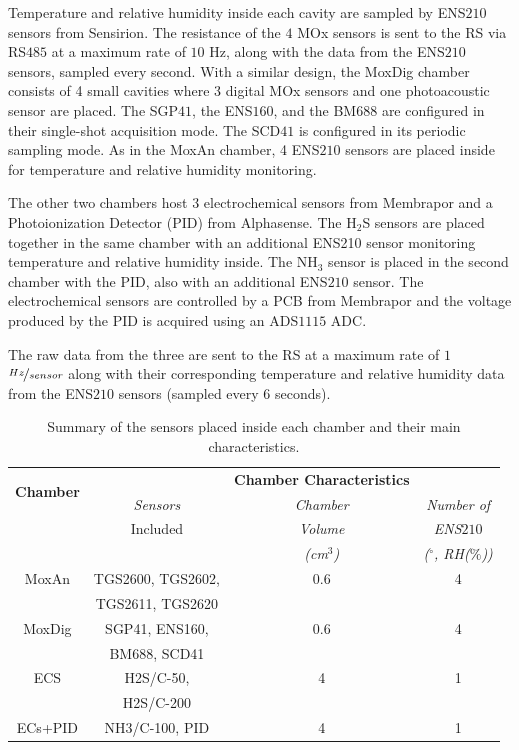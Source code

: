 \documentclass[lettersize,journal]{IEEEtran}
\begin{document}
Temperature and relative humidity inside each cavity are sampled by ENS$210$ sensors from Sensirion. The resistance of the $4$ MOx sensors is sent to the RS via RS$485$ at a maximum rate of $10$ Hz, along with the data from the ENS$210$ sensors, sampled every second.
With a similar design, the MoxDig chamber consists of 4 small cavities where $3$ digital MOx sensors and one photoacoustic sensor are placed. The SGP$41$, the ENS$160$, and the BM$688$ are configured in their single-shot acquisition mode. The SCD$41$ is configured in its periodic sampling mode.
As in the MoxAn chamber, 4 ENS$210$ sensors are placed inside for temperature and relative humidity monitoring. 

The other two chambers host $3$ electrochemical sensors from Membrapor and a Photoionization Detector (PID) from Alphasense. The H$_{2}$S sensors are placed together in the same chamber with an additional ENS210 sensor monitoring temperature and relative humidity inside. The NH$_{3}$ sensor is placed in the second chamber with the PID, also with an additional ENS$210$ sensor. The electrochemical sensors are controlled by a PCB from Membrapor and the voltage produced by the PID is acquired using an ADS$1115$ ADC. 

The raw data from the three  are sent to the RS at a maximum rate of $1$~$\nicefrac{Hz}{sensor}$ along with their corresponding temperature and relative humidity data from the ENS$210$ sensors (sampled every $6$ seconds).

\begin{table}
	\caption{Summary of the sensors placed inside each chamber and their main characteristics.}
	\setlength{\tabcolsep}{0.5\tabcolsep}%
	\centering
	\begin{tabular}{ *{4}{c} }
	\toprule
	\multirow{2}{*}{\textbf{Chamber}} & & \textbf{Chamber Characteristics}\\
		& \textit{Sensors} & \textit{Chamber} & \textit{Number of}\\
		& {Included} & \textit{Volume} & \textit{ENS$210$}\\
		& &\textit{(cm$^{3}$)} & \textit{($^{\circ}$, RH($\%$))}\\
		\midrule
		MoxAn & TGS2600, TGS2602,   & 0.6    & 4\\
		    & TGS2611, TGS2620	  &        &  \\
		MoxDig & SGP41, ENS160, & 0.6    & 4\\
		     & BM688, SCD41	  &        &  \\
		ECS & H2S/C-50, & 4 & 1\\
		  & H2S/C-200 & & \\
		ECs+PID & NH3/C-100, PID & 4 & 1\\
		\bottomrule
	\end{tabular}
	\label{tab:fastIOMSsensors}
\end{table}
 
\end{document}
